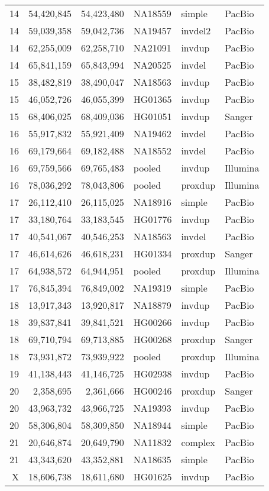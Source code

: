 {\begin{tiny}
\begin{longtable}{rrrlll}
    14  & 54,420,845  & 54,423,480  & NA18559 & simple  & PacBio  \\
    14  & 59,039,358  & 59,042,736  & NA19457 & invdel2 & PacBio  \\
    14  & 62,255,009  & 62,258,710  & NA21091 & invdup  & PacBio  \\
    14  & 65,841,159  & 65,843,994  & NA20525 & invdel  & PacBio  \\
    15  & 38,482,819  & 38,490,047  & NA18563 & invdup  & PacBio  \\
    15  & 46,052,726  & 46,055,399  & HG01365 & invdup  & PacBio  \\
    15  & 68,406,025  & 68,409,036  & HG01051 & invdup  & Sanger  \\
    16  & 55,917,832  & 55,921,409  & NA19462 & invdel  & PacBio  \\
    16  & 69,179,664  & 69,182,488  & NA18552 & invdel  & PacBio  \\
    16  & 69,759,566  & 69,765,483  & pooled  & invdup  & Illumina  \\
    16  & 78,036,292  & 78,043,806  & pooled  & proxdup & Illumina  \\
    17  & 26,112,410  & 26,115,025  & NA18916 & simple  & PacBio  \\
    17  & 33,180,764  & 33,183,545  & HG01776 & invdup  & PacBio  \\
    17  & 40,541,067  & 40,546,253  & NA18563 & invdel  & PacBio  \\
    17  & 46,614,626  & 46,618,231  & HG01334 & proxdup & Sanger  \\
    17  & 64,938,572  & 64,944,951  & pooled  & proxdup & Illumina  \\
    17  & 76,845,394  & 76,849,002  & NA19319 & simple  & PacBio  \\
    18  & 13,917,343  & 13,920,817  & NA18879 & invdup  & PacBio  \\
    18  & 39,837,841  & 39,841,521  & HG00266 & invdup  & PacBio  \\
    18  & 69,710,794  & 69,713,885  & HG00268 & proxdup & Sanger  \\
    18  & 73,931,872  & 73,939,922  & pooled  & proxdup & Illumina  \\
    19  & 41,138,443  & 41,146,725  & HG02938 & invdup  & PacBio  \\
    20  & 2,358,695   & 2,361,666   & HG00246 & proxdup & Sanger  \\
    20  & 43,963,732  & 43,966,725  & NA19393 & invdup  & PacBio  \\
    20  & 58,306,804  & 58,309,850  & NA18944 & simple  & PacBio  \\
    21  & 20,646,874  & 20,649,790  & NA11832 & complex & PacBio  \\
    21  & 43,343,620  & 43,352,881  & NA18635 & simple  & PacBio  \\
    X   & 18,606,738  & 18,611,680  & HG01625 & invdup  & PacBio  \\
    \end{longtable}
    \end{tiny}

}
